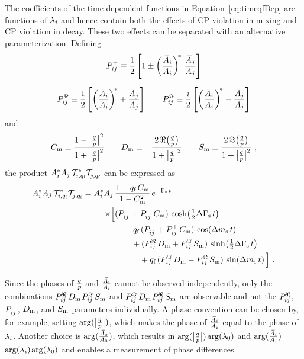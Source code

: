 The coefficients of the time-dependent functions in Equation~\ref{eq:timeqfDep} are functions of $\lamf[i]$ and hence contain both the
effects of CP violation in mixing and CP violation in decay. These two effects can be separated with an alternative parameterization.
Defining
\begin{equation}
  \label{eq:decayRho}
  \begin{gathered}
    \Ppm \equiv \frac{1}{2} \left[ 1 \pm \left(\frac{\Abari}{\Ai}\right)^{\!*}\, \frac{\Abari[j]}{\Ai[j]} \right] \\[0.6em]
    \Pre \equiv \frac{1}{2} \left[ \left(\frac{\Abari}{\Ai}\right)^{\!*} + \frac{\Abari[j]}{\Ai[j]} \right] \quad\quad
    \Pim \equiv \frac{i}{2} \left[ \left(\frac{\Abari}{\Ai}\right)^{\!*} - \frac{\Abari[j]}{\Ai[j]} \right]
  \end{gathered}
\end{equation}
and
\begin{equation}
  \label{eq:mixCDS}
  \Cm \equiv \frac{1-\qpAbsAlt^2}{1+\qpAbsAlt^2}
  \qquad \Dm \equiv -\frac{2\,\Re\big(\qpAlt\big)}{1+\qpAbsAlt^2}
  \qquad \Sm \equiv  \frac{2\,\Im\big(\qpAlt\big)}{1+\qpAbsAlt^2}
  \ ,
\end{equation}
the product $\Ai^*\Ai[j]\,\timeAmp[i,\qf]^*\timeAmp[j,\qf]^{\phantom{*}}$ can be expressed as
\begin{equation}
  \label{eq:timeqfDepSep}
  \begin{aligned}
    \Ai^*\Ai[j]\,\timeAmp[i,\qf]^*\timeAmp[j,\qf]^{\phantom{*}} =
      \Ai^*\Ai[j]\, &\frac{1-\qf\,\Cm}{1-\Cm^2}\, \eGst \\
        \times\Big[ &(\Ppl+\Pmn\,\Cm)\,\cDGs \\
                    &\quad + \qf\,(\Pmn+\Ppl\,\Cm)\,\cDms \\
                    &\quad\quad + (\Pre\,\Dm+\Pim\,\Sm)\,\sDGs \\
                    &\quad\quad\quad + \qf\,(\Pim\,\Dm-\Pre\,\Sm)\,\sDms \Big] \ .
  \end{aligned}
\end{equation}

Since the phases of $\qp$ and $\frac{\Abari}{\Ai}$ cannot be observed independently, only the combinations $\Pre\,\Dm$\textplus$\Pim\,\Sm$
and $\Pim\,\Dm$\textminus$\Pre\,\Sm$ are observable and not the $\Pre$, $\Pmn$, $\Dm$, and $\Sm$ parameters individually. A phase
convention can be chosen by, for example, setting $\arg(\qpAbsAlt)$, which makes the phase of $\frac{\Abari}{\Ai}$ equal
to the phase of $\lamf[i]$. Another choice is $\arg(\frac{\Abari[\text{0}]}{\Ai[\text{0}]})$,
which results in $\arg(\qpAbsAlt)$\texteq$\arg(\lamf[\text{0}])$ and
$\arg(\frac{\Abari}{\Ai})$\texteq$\arg(\lamf[i])$\textminus$\arg(\lamf[\text{0}])$ and enables a measurement of phase differences.
